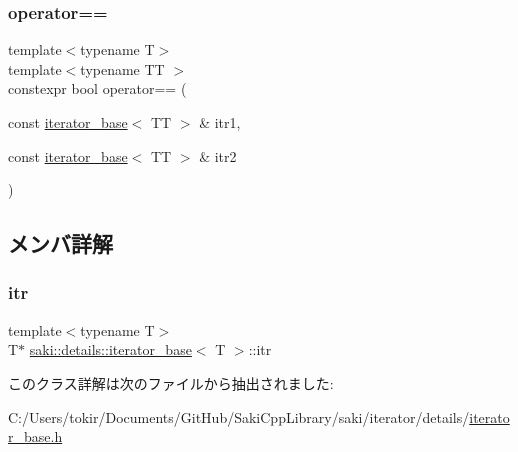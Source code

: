\subsubsection{\texorpdfstring{operator==}{operator==}}
{\footnotesize\ttfamily template$<$typename T$>$ \\
template$<$typename TT $>$ \\
constexpr bool operator== (\begin{DoxyParamCaption}\item[{const \mbox{\hyperlink{classsaki_1_1details_1_1iterator__base}{iterator\+\_\+base}}$<$ TT $>$ \&}]{itr1,  }\item[{const \mbox{\hyperlink{classsaki_1_1details_1_1iterator__base}{iterator\+\_\+base}}$<$ TT $>$ \&}]{itr2 }\end{DoxyParamCaption})\hspace{0.3cm}{\ttfamily [friend]}}



\subsection{メンバ詳解}
\mbox{\label{classsaki_1_1details_1_1iterator__base_a26c42413a1c967669da4a52b1fe65f13}} 
\subsubsection{\texorpdfstring{itr}{itr}}
{\footnotesize\ttfamily template$<$typename T$>$ \\
T$\ast$ \mbox{\hyperlink{classsaki_1_1details_1_1iterator__base}{saki\+::details\+::iterator\+\_\+base}}$<$ T $>$\+::itr\hspace{0.3cm}{\ttfamily [protected]}}



このクラス詳解は次のファイルから抽出されました\+:\begin{DoxyCompactItemize}
\item 
C\+:/\+Users/tokir/\+Documents/\+Git\+Hub/\+Saki\+Cpp\+Library/saki/iterator/details/\mbox{\hyperlink{iterator__base_8h}{iterator\+\_\+base.\+h}}\end{DoxyCompactItemize}
